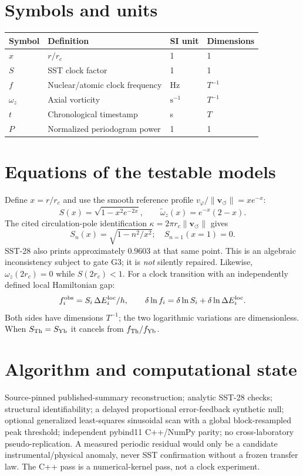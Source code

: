 \documentclass[11pt,a4paper]{article}
\newcommand{\vswirl}{\mathbf{v}_{\!\boldsymbol{\circlearrowleft}}}
\newcommand{\rc}{r_c}
\begin{document}
\section{Symbols and units}
\begin{longtable}{llll}\toprule Symbol & Definition & SI unit & Dimensions\\\midrule
$x$ & $r/\rc$ & 1 & 1\\
$S$ & SST clock factor & 1 & 1\\
$f$ & Nuclear/atomic clock frequency & Hz & $T^{-1}$\\
$\omega_z$ & Axial vorticity & $\mathrm{s}^{-1}$ & $T^{-1}$\\
$t$ & Chronological timestamp & s & $T$\\
$P$ & Normalized periodogram power & 1 & 1\\\bottomrule\end{longtable}
\section{Equations of the testable models}
Define $x=r/\rc$ and use the smooth reference profile $v_\varphi/\|\vswirl\|=xe^{-x}$:
\begin{equation}S(x)=\sqrt{1-x^2e^{-2x}},\qquad \tilde{\omega}_z(x)=e^{-x}(2-x).\end{equation}
The cited circulation-pole identification $\kappa=2\pi\rc\|\vswirl\|$ gives
\begin{equation}S_n(x)=\sqrt{1-n^2/x^2};\quad S_{n=1}(x=1)=0.\end{equation}
SST-28 also prints approximately $0.9603$ at that same point. This is an algebraic inconsistency subject to gate G3; it is \emph{not} silently repaired. Likewise, $\omega_z(2\rc)=0$ while $S(2\rc)<1$.
For a clock transition with an independently defined local Hamiltonian gap:
\begin{equation} f_i^{\rm obs}=S_i\,\Delta E_i^{\rm loc}/h,\qquad \delta\ln f_i=\delta\ln S_i+\delta\ln\Delta E_i^{\rm loc}.\end{equation}
Both sides have dimensions $T^{-1}$; the two logarithmic variations are dimensionless. When $S_{\rm Th}=S_{\rm Yb}$ it cancels from $f_{\rm Th}/f_{\rm Yb}$.
\section{Algorithm and computational state}
Source-pinned published-summary reconstruction; analytic SST-28 checks; structural identifiability; a delayed proportional error-feedback synthetic null; optional generalized least-squares sinusoidal scan with a global block-resampled peak threshold; independent pybind11 C++/NumPy parity; no cross-laboratory pseudo-replication. A measured periodic residual would only be a candidate instrumental/physical anomaly, never SST confirmation without a frozen transfer law. The C++ pass is a numerical-kernel pass, not a clock experiment.
\end{document}
